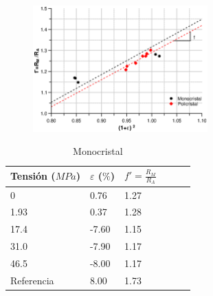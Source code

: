 \documentclass[usenames,dvipsnames]{beamer}
\begin{document}
\begin{frame}
 
 \begin{figure}
 \includegraphics[width=0.6\textwidth]{img/resistencia/PoliMono2.eps}
 \end{figure}

 \begin{multicols}{2}
 
\begin{table} 
\tiny
\begin{tabular}{@{}llllll@{}} \toprule
Tensión ($MPa$) & $\varepsilon$ ($\%$) &  $f'=\frac{R_M}{R_A}$\\ \midrule
 0        &  0.76   & 1.27\\
 1.93       &  0.37   & 1.28\\
 17.4      &  -7.60  & 1.15\\
 31.0      &  -7.90  & 1.17\\
 46.5     &  -8.00  & 1.17  \\
 Referencia    & 8.00  &  1.73   \\
 \bottomrule
\end{tabular}
 \caption{Monocristal}
\end{table}


\end{multicols}
\end{frame}
\end{document}
